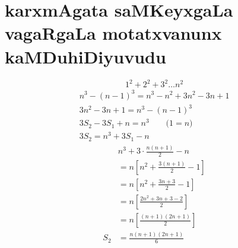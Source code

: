 \chapter{karxmAgata saMKeyxgaLa vagaRgaLa motatxvanunx kaMDuhiDiyuvudu}
\vskip -20pt

$$
1^2+2^2+3^2\ldots n^2
$$
\begin{gather*}
n^3 -(n-1)^3 = n^3 - n^2+3n^2 - 3n+1\\
3n^2-3n+1 = n^3-(n-1)^3\\
3S_{2}-3S_{1} +n = n^3 \qquad\text{($1=n$)}\\
3S_{2} = n^3+ 3S_{1}-n
\end{gather*}
\begin{align*}
&n^3 + 3 \cdot \frac{n(n+1)}{2} -n\\
&=n\left[n^2+\frac {3(n+1)}{2}-1\right]\\
&=n \left[n^2+\frac{3n+3}{2}-1\right]\\
&=n\left[\frac{2n^2 + 3n + 3 - 2}{2}\right]\\
&=n\left[\frac{(n+1)(2n+1)}{2}\right]\\
S_2 &=\frac{n(n+1)(2n+1)}{6}
\end{align*}
